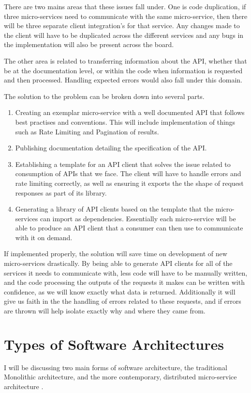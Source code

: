 There are two mains areas that these issues fall under. One is code duplication, if three micro-services need to communicate with the same micro-service, then there will  be three separate client integration's for that service. Any changes made to the client will have to be duplicated across the different services and any bugs in the implementation will also be present across the board. 

The other area is related to transferring information about the API, whether that be at the documentation level, or within the code when information is requested and then processed. Handling expected errors would also fall under this domain.

The solution to the problem can be broken down into several parts.
 \begin{enumerate}
   \item Creating an exemplar micro-service with a well documented API that follows best practises and conventions. This will include implementation of things such as Rate Limiting and Pagination of results.
   \item Publishing documentation detailing the specification of the API.
   \item Establishing a template for an API client that solves the issue related to consumption of APIs that we face. The client will have to handle errors and rate limiting correctly, as well as ensuring it exports the the shape of request responses as part of its library.
   \item Generating a library of API clients based on the template that the micro-services can import as dependencies. Essentially each micro-service will be able to produce an API client that a consumer can then use to communicate with it on demand.
 \end{enumerate}
 
 If implemented properly, the solution will save time on development of new micro-services drastically. By being able to generate API clients for all of the services it needs to communicate with, less code will have to be manually written, and the code processing the outputs of the requests it makes can be written with confidence, as we will know exactly what data is returned. Additionally it will give us faith in the the handling of errors related to these requests, and if errors are thrown will help isolate exactly why and where they came from. 
 
\section{Types of Software Architectures}
I will be discussing two main forms of software architecture, the traditional Monolithic architecture, and the more contemporary, distributed micro-service architecture .

